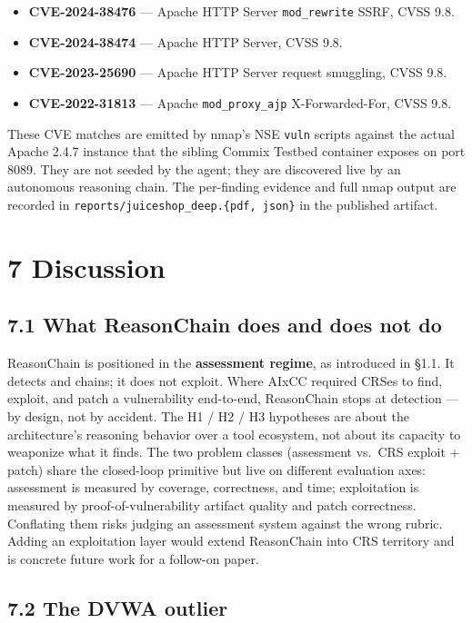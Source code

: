 \documentclass[
]{article}
\providecommand{\tightlist}{%
  \setlength{\itemsep}{0pt}\setlength{\parskip}{0pt}}
\begin{document}
\begin{itemize}
\tightlist
\item
  \textbf{CVE-2024-38476} --- Apache HTTP Server \texttt{mod\_rewrite}
  SSRF, CVSS 9.8.
\item
  \textbf{CVE-2024-38474} --- Apache HTTP Server, CVSS 9.8.
\item
  \textbf{CVE-2023-25690} --- Apache HTTP Server request smuggling, CVSS
  9.8.
\item
  \textbf{CVE-2022-31813} --- Apache \texttt{mod\_proxy\_ajp}
  X-Forwarded-For, CVSS 9.8.
\end{itemize}

These CVE matches are emitted by nmap's NSE \texttt{vuln} scripts
against the actual Apache 2.4.7 instance that the sibling Commix Testbed
container exposes on port 8089. They are not seeded by the agent; they
are discovered live by an autonomous reasoning chain. The per-finding
evidence and full nmap output are recorded in
\texttt{reports/juiceshop\_deep.\{pdf,\ json\}} in the published
artifact.

\section{7 Discussion}\label{discussion}

\subsection{7.1 What ReasonChain does and does not
do}\label{what-reasonchain-does-and-does-not-do}

ReasonChain is positioned in the \textbf{assessment regime}, as
introduced in §1.1. It detects and chains; it does not exploit. Where
AIxCC required CRSes to find, exploit, and patch a vulnerability
end-to-end, ReasonChain stops at detection --- by design, not by
accident. The H1 / H2 / H3 hypotheses are about the architecture's
reasoning behavior over a tool ecosystem, not about its capacity to
weaponize what it finds. The two problem classes (assessment vs.~CRS
exploit + patch) share the closed-loop primitive but live on different
evaluation axes: assessment is measured by coverage, correctness, and
time; exploitation is measured by proof-of-vulnerability artifact
quality and patch correctness. Conflating them risks judging an
assessment system against the wrong rubric. Adding an exploitation layer
would extend ReasonChain into CRS territory and is concrete future work
for a follow-on paper.

\subsection{7.2 The DVWA outlier}\label{the-dvwa-outlier}
\end{document}
